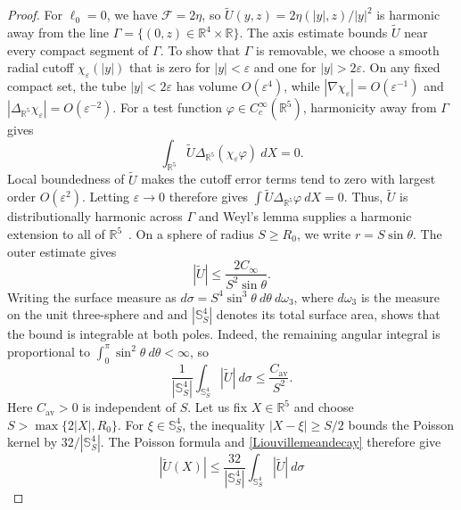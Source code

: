 \documentclass[amsmath,amsfonts,amssymb,aps,pra,superscriptaddress,10pt]{revtex4-2}
\numberwithin{equation}{section}
\theoremstyle{plain}
\theoremstyle{definition}
\theoremstyle{remark}
\theoremstyle{definition}
\newcommand{\ellzero}{\ell_0}
\begin{document}
\begin{proof}
For $\ellzero=0$, we have $\mathcal{F}=2\eta$, so $\widetilde{U}(y,z)=2\eta(|y|,z)/|y|^2$ is harmonic away from the line
$\Gamma=\{(0,z)\in\mathbb{R}^4\times\mathbb{R}\}$. The axis estimate bounds $\widetilde{U}$ near every compact segment of $\Gamma$. To show that $\Gamma$ is removable, we choose a smooth radial cutoff $\chi_\varepsilon(|y|)$ that is zero for $|y|<\varepsilon$ and one for $|y|>2\varepsilon$. On any fixed compact set, the tube $|y|<2\varepsilon$ has volume $O(\varepsilon^4)$, while $|\nabla\chi_\varepsilon|=O(\varepsilon^{-1})$ and $|\Delta_{\mathbb{R}^5}\chi_\varepsilon|=O(\varepsilon^{-2})$. For a test function $\varphi\in C_c^\infty(\mathbb{R}^5)$, harmonicity away from $\Gamma$ gives
\begin{equation}
\int_{\mathbb{R}^5}\widetilde{U}\Delta_{\mathbb{R}^5}(\chi_\varepsilon\varphi)~dX=0.
\end{equation}
Local boundedness of $\widetilde{U}$ makes the cutoff error terms tend to zero with largest order $O(\varepsilon^2)$. Letting $\varepsilon\to 0$ therefore gives $\int\widetilde{U}\Delta_{\mathbb{R}^5}\varphi~dX=0$. Thus, $\widetilde{U}$ is distributionally harmonic across $\Gamma$ and Weyl's lemma supplies a harmonic extension to all of $\mathbb{R}^5$~\cite{Evans2010PDE}. On a sphere of radius $S\geq R_0$, we write $r=S\sin{\theta}$. The outer estimate gives
\begin{equation}
|\widetilde{U}|\leq\frac{2C_\infty}{S^2\sin{\theta}}.
\end{equation}
Writing the surface measure as $d\sigma=S^4\sin^3{\theta}~d\theta~d\omega_3$, where $d\omega_3$ is the measure on the unit three-sphere and and $|\mathbb{S}^4_S|$ denotes its total surface area, shows that the bound is integrable at both poles. Indeed, the remaining angular integral is proportional to $\int_0^\pi\sin^2{\theta}~d\theta<\infty$, so
\begin{equation}\label{Liouvillemeandecay}
\frac{1}{|\mathbb{S}^4_S|}\int_{\mathbb{S}^4_S}|\widetilde{U}|~d\sigma
\leq\frac{C_{\mathrm{av}}}{S^2}.
\end{equation}
Here $C_{\mathrm{av}}>0$ is independent of $S$. Let us fix $X\in\mathbb{R}^5$ and choose $S>\max\{2|X|,R_0\}$. For $\xi\in\mathbb{S}^4_S$, the inequality $|X-\xi|\geq S/2$ bounds the Poisson kernel by $32/|\mathbb{S}^4_S|$. The Poisson formula and \eqref{Liouvillemeandecay} therefore give
\begin{equation}
|\widetilde{U}(X)|\leq\frac{32}{|\mathbb{S}^4_S|}\int_{\mathbb{S}^4_S}|\widetilde{U}|~d\sigma

\end{equation}
\end{proof}
\end{document}
